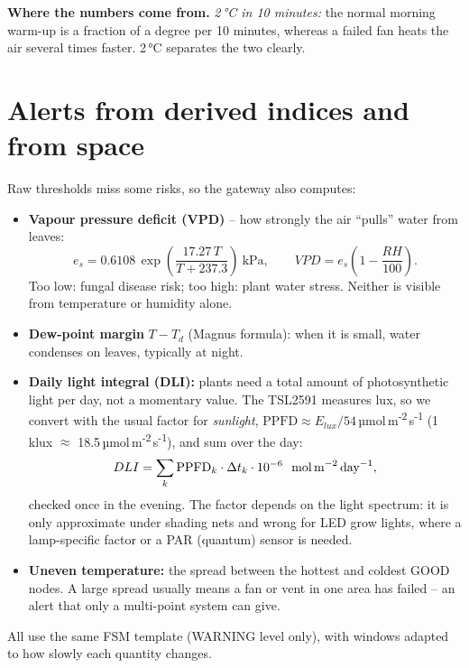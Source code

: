 \documentclass[11pt,a4paper]{report}
\newcommand{\why}[1]{\par\noindent\colorbox{gray!10}{\parbox{\dimexpr\linewidth-2\fboxsep}{\small\textbf{Where the numbers come from.} #1}}\par}
\begin{document}
\why{\emph{2\,°C in 10 minutes:} the normal morning warm-up is a fraction of a degree per 10 minutes, whereas a failed fan heats the air several times faster. 2\,°C separates the two clearly.}

\section{Alerts from derived indices and from space}\label{sec:derived}
Raw thresholds miss some risks, so the gateway also computes:
\begin{itemize}
  \item \textbf{Vapour pressure deficit (VPD)} -- how strongly the air ``pulls'' water from leaves:
  \begin{equation}
    e_s = 0.6108\,\exp\!\left(\frac{17.27\,T}{T + 237.3}\right)\ \text{kPa}, \qquad VPD = e_s\left(1 - \frac{RH}{100}\right).
  \end{equation}
  Too low: fungal disease risk; too high: plant water stress. Neither is visible from temperature or humidity alone.
  \item \textbf{Dew-point margin} $T - T_d$ (Magnus formula): when it is small, water condenses on leaves, typically at night.
  \item \textbf{Daily light integral (DLI):} plants need a total amount of photosynthetic light per day, not a momentary value. The TSL2591 measures lux, so we convert with the usual factor for \emph{sunlight}, $\mathrm{PPFD} \approx E_{lux}/54$\,µmol\,m\textsuperscript{-2}\,s\textsuperscript{-1} (1\,klux $\approx$ 18.5\,µmol\,m\textsuperscript{-2}\,s\textsuperscript{-1}), and sum over the day:
  \begin{equation}
    DLI = \sum_k \mathrm{PPFD}_k \cdot \Delta t_k \cdot 10^{-6}\ \ \text{mol\,m}^{-2}\,\text{day}^{-1},
  \end{equation}
  checked once in the evening. The factor depends on the light spectrum: it is only approximate under shading nets and wrong for LED grow lights, where a lamp-specific factor or a PAR (quantum) sensor is needed.
  \item \textbf{Uneven temperature:} the spread between the hottest and coldest GOOD nodes. A large spread usually means a fan or vent in one area has failed -- an alert that only a multi-point system can give.
\end{itemize}
All use the same FSM template (WARNING level only), with windows adapted to how slowly each quantity changes.
\end{document}
